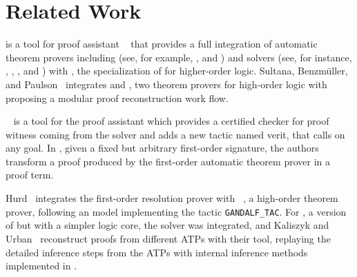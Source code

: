 \documentclass[main.tex]{subfiles}
\begin{document}

\section{Related Work}
\label{sec:related-work}

 is a tool for  proof assistant
~\cite{paulson1994isabelle} that provides a full integration of automatic
theorem provers including \ATPs
(see, for example, \cite{meng2006automation}, \cite{blanchette2013extending}
and \cite{Fleury2014}) and \SMT solvers (see, for instance,
\cite{hurlin07practical}, \cite{bohme2010},
\cite{blanchette2013extending}, and \cite{Fleury2014}) with
 \cite{nipkow2002isabelle}, the specialization of
 for higher-order logic. Sultana, Benzm{\"{u}}ller, and
Paulson~\cite{Een2004} integrates  and , two
theorem provers for high-order logic with  proposing a
modular proof reconstruction work flow.

~\cite{armand2011,Ekici2017} is a tool for the 
proof assistant \cite{coqteam} which provides a certified checker for
proof witness coming from the \SMT solver  \cite{bouton2009}
and adds a new tactic named verit, that calls  on any
 goal. In \cite{bezem2002automated}, given a fixed but arbitrary
first-order signature, the authors transform a proof produced by the
first-order automatic theorem prover  \cite{deNivelle2003}
in a  proof term.

Hurd~\cite{Hurd1999} integrates the first-order resolution prover
 with ~\cite{norrish2007hol}, a high-order theorem
prover, following an  model implementing the tactic \verb!GANDALF_TAC!.
For , a version of  but with a simpler logic core,
the \SMT solver  was integrated, and Kaliszyk and
Urban~\cite{kaliszyk2013} reconstruct proofs from different ATPs with their
 tool, replaying the detailed inference steps from the ATPs with
internal inference methods implemented in .



\end{document}
